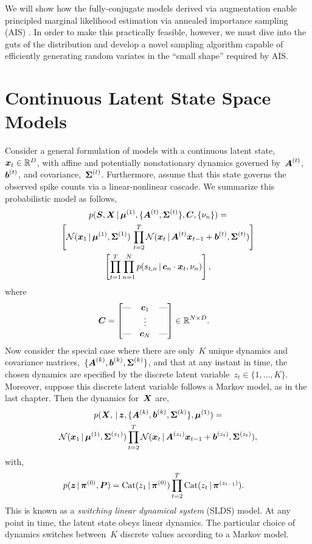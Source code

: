 We will show how the fully-conjugate models derived via \polyagamma
augmentation enable principled marginal likelihood estimation
via annealed importance sampling (AIS) \citep{neal2001annealed}. In order
to make this practically feasible, however, we must dive into the
guts of the \polyagamma distribution and develop a novel sampling
algorithm capable of efficiently generating random variates in the
``small shape'' required by AIS. 
 
 
\section{Continuous Latent State Space Models}
Consider a general formulation of models with a continuous latent
state,~$\boldsymbol{x}_t \in \mathbb{R}^D$, with affine and potentially nonstationary
dynamics governed by~$\boldsymbol{A}^{(t)}$,~$\boldsymbol{b}^{(t)}$, and
covariance,~$\boldsymbol{\Sigma}^{(t)}$. Furthermore, assume that this state
governs the observed spike counts via a linear-nonlinear cascade.  We
summarize this probabilistic model as follows,
\begin{multline}
  p(\boldsymbol{S}, \boldsymbol{X} \,|\,  \boldsymbol{\mu}^{(1)}, \{\boldsymbol{A}^{(t)}, \boldsymbol{\Sigma}^{(t)}\}, \boldsymbol{C}, \{\nu_n\})
  = \\
  \left[
    \mathcal{N}(\boldsymbol{x}_1 \,|\, \boldsymbol{\mu}^{(1)}, \boldsymbol{\Sigma}^{(1)}) \,
    \prod_{t=2}^T \mathcal{N}(\boldsymbol{x}_t \,|\, \boldsymbol{A}^{(t)} \boldsymbol{x}_{t-1} + \boldsymbol{b}^{(t)}, \boldsymbol{\Sigma}^{(t)})
  \right] \\
  \left[
    \prod_{t=1}^T \prod_{n=1}^N p(s_{t,n} \,|\, \boldsymbol{c}_n \cdot \boldsymbol{x}_t, \nu_n)
  \right],
\end{multline}
where
\begin{align*}
  \boldsymbol{C} &=
        \begin{bmatrix}
          \text{---} &  \boldsymbol{c}_1  & \text{---} \\
            &  \vdots &   \\
          \text{---} &  \boldsymbol{c}_N  & \text{---}
        \end{bmatrix} \in \mathbb{R}^{N \times D}.
\end{align*}
Now consider the special case where there are only~$K$ unique dynamics
and covariance matrices,~${\{\boldsymbol{A}^{(k)}, \boldsymbol{b}^{(k)}, \boldsymbol{\Sigma}^{(k)}\}}$, and that at
any instant in time, the chosen dynamics are specified by the
discrete latent variable~${z_t \in \{1, \ldots, K\}}$. Moreover,
suppose this discrete latent variable follows a Markov model,
as in the last chapter. Then the dynamics for~$\boldsymbol{X}$
are,
\begin{multline}
  p(\boldsymbol{X}, \,|\, \boldsymbol{z}, \{\boldsymbol{A}^{(k)}, \boldsymbol{b}^{(k)}, \boldsymbol{\Sigma}^{(k)}\}, \boldsymbol{\mu}^{(1)})
  = \\ 
    \mathcal{N}(\boldsymbol{x}_1 \,|\, \boldsymbol{\mu}^{(1)}, \boldsymbol{\Sigma}^{(z_1)})
    \prod_{t=2}^T \mathcal{N}(\boldsymbol{x}_t \,|\, \boldsymbol{A}^{(z_t)} \boldsymbol{x}_{t-1} + \boldsymbol{b}^{(z_t)}, \boldsymbol{\Sigma}^{(z_t)}),
\end{multline}
with,
\begin{align*}
  p(\boldsymbol{z} \,|\, \boldsymbol{\pi}^{(0)}, \boldsymbol{P}) &=
  \mathrm{Cat}(z_1\,|\, \boldsymbol{\pi}^{(0)})
  \prod_{t=2}^T \mathrm{Cat}(z_t \,|\, \boldsymbol{\pi}^{(z_{t-1})}).
\end{align*}
This is known as a \emph{switching linear dynamical system} (SLDS)
model. At any point in time, the latent state obeys linear dynamics.
The particular choice of dynamics switches between~$K$ discrete values
according to a Markov model.

